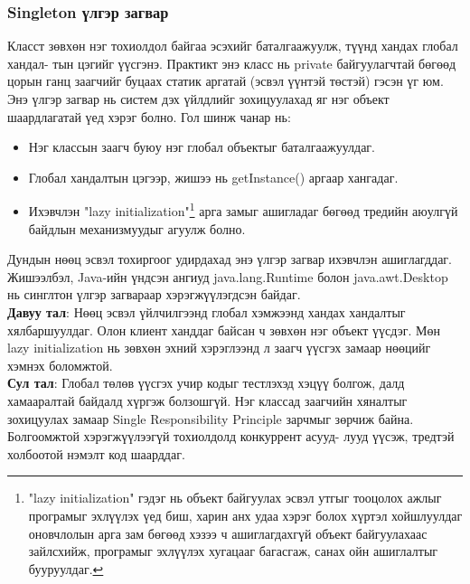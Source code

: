 \subsubsection{Singleton үлгэр загвар}
\quad \quad Класст зөвхөн нэг тохиолдол байгаа эсэхийг баталгаажуулж, түүнд хандах глобал хандал- тын цэгийг үүсгэнэ.
Практикт энэ класс нь private байгуулагчтай бөгөөд цорын ганц заагчийг буцаах статик аргатай (эсвэл үүнтэй төстэй) гэсэн үг юм. Энэ үлгэр загвар нь систем дэх үйлдлийг зохицуулахад яг нэг объект шаардлагатай үед хэрэг болно. Гол шинж чанар нь:
\begin{itemize}
	\item Нэг классын заагч буюу нэг глобал объектыг баталгаажуулдаг.
	\item Глобал хандалтын цэгээр, жишээ нь getInstance() аргаар хангадаг.
	\item Ихэвчлэн "lazy initialization"\footnote{"lazy initialization" гэдэг нь объект байгуулах эсвэл утгыг тооцолох ажлыг програмыг эхлүүлэх үед биш, харин анх удаа хэрэг болох хүртэл хойшлуулдаг оновчлолын арга зам бөгөөд хэзээ ч ашиглагдахгүй объект байгуулахаас зайлсхийж, програмыг эхлүүлэх хугацааг багасгаж, санах ойн ашиглалтыг бууруулдаг.} арга замыг ашигладаг бөгөөд тредийн аюулгүй байдлын механизмуудыг агуулж болно.
\end{itemize}
Дундын нөөц эсвэл тохиргоог удирдахад энэ үлгэр загвар ихэвчлэн ашиглагддаг. Жишээлбэл, Java-ийн үндсэн ангиуд java.lang.Runtime болон java.awt.Desktop нь синглтон үлгэр загвараар хэрэгжүүлэгдсэн байдаг. \\
\textbf{Давуу тал}: Нөөц эсвэл үйлчилгээнд глобал хэмжээнд хандах хандалтыг хялбаршуулдаг. Олон клиент ханддаг байсан ч зөвхөн нэг объект үүсдэг. Мөн lazy initialization нь зөвхөн эхний хэрэглээнд л заагч үүсгэх замаар нөөцийг хэмнэх боломжтой. \\
\textbf{Сул тал}: Глобал төлөв үүсгэх учир кодыг тестлэхэд хэцүү болгож, далд хамааралтай байдалд хүргэж болзошгүй. Нэг классад заагчийн хяналтыг зохицуулах замаар Single Responsibility Principle зарчмыг зөрчиж байна. Болгоомжтой хэрэгжүүлээгүй тохиолдолд конкуррент асууд- лууд үүсэж, тредтэй холбоотой нэмэлт код шаарддаг.

